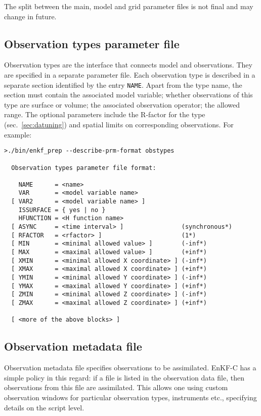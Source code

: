 \documentclass[11pt]{report}
\begin{document}
The split between the main, model and grid parameter files is not final and may change in future.

\subsection{Observation types parameter file}
\label{sec:obstypesprm}

Observation types are the interface that connects model and observations.
They are specified in a separate parameter file.
Each observation type is described in a separate section identified by the entry \verb|NAME|.
Apart from the type name, the section must contain the associated model variable; whether observations of this type are surface or volume; the associated observation operator; the allowed range.
The optional parameters include the R-factor for the type (sec.~\ref{sec:datuning}) and spatial limits on corresponding observations.
For example:
\begin{Verbatim}[frame=single,fontsize=\footnotesize]
>./bin/enkf_prep --describe-prm-format obstypes

  Observation types parameter file format:

    NAME      = <name>
    VAR       = <model variable name>
  [ VAR2      = <model variable name> ]
    ISSURFACE = { yes | no }
    HFUNCTION = <H function name>
  [ ASYNC     = <time interval> ]                (synchronous*)
  [ RFACTOR   = <rfactor> ]                      (1*)
  [ MIN       = <minimal allowed value> ]        (-inf*)
  [ MAX       = <maximal allowed value> ]        (+inf*)
  [ XMIN      = <minimal allowed X coordinate> ] (-inf*)
  [ XMAX      = <maximal allowed X coordinate> ] (+inf*)
  [ YMIN      = <minimal allowed Y coordinate> ] (-inf*)
  [ YMAX      = <maximal allowed Y coordinate> ] (+inf*)
  [ ZMIN      = <minimal allowed Z coordinate> ] (-inf*)
  [ ZMAX      = <maximal allowed Z coordinate> ] (+inf*)

  [ <more of the above blocks> ]
\end{Verbatim}

\subsection{Observation metadata file}

Observation metadata file specifies observations to be assimilated.
EnKF-C has a simple policy in this regard: if a file is listed in the observation data file, then observations from this file are assimilated.
This allows one using custom observation windows for particular observation types, instruments etc., specifying details on the script level.
\end{document}
